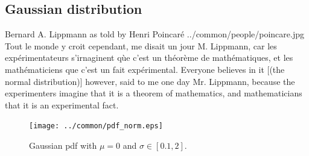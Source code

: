 \subsection{Gaussian distribution}
\qboxnpqt
  {Bernard A. Lippmann as told by Henri Poincar\'e
   
   
   \footnotemark
  }
  {../common/people/poincare.jpg}
  {Tout le monde y croit cependant, me disait un jour M. Lippmann,
   car les exp\'erimentateurs s'irnaginent q\`ue c'est un th\'eor\`eme
   de math\'ematiques, et les math\'ematiciens que c'est un fait
   exp\'erimental.}
  {Everyone believes in it [(the normal distribution)] however,
   said to me one day Mr. Lippmann, because the experimenters imagine that
   it is a theorem of mathematics,
   and mathematicians that it is an experimental fact.}

\begin{figure}[ht]
   \begin{center}
   \texttt{[image: ../common/pdf\_norm.eps]}
   \end{center}
\caption{
  Gaussian pdf with $\mu=0$ and $\sigma\in[0.1,2]$.
  \label{fig:pdf_norm}
  }
\end{figure}

\begin{definition}
\end{definition}

